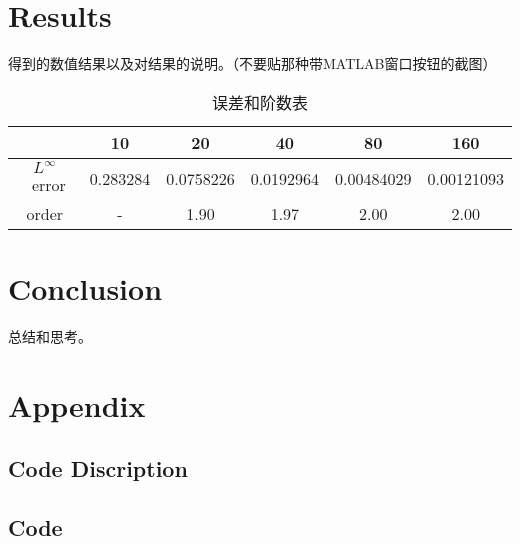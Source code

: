 \documentclass{article}
\begin{document}
\section{Results}

得到的数值结果以及对结果的说明。（不要贴那种带MATLAB窗口按钮的截图）


\begin{table}[ht]
    \centering
    \caption{误差和阶数表}\label{tab:demo0}
    \begin{tabular}{c|ccccc}
        \hline
                           & 10       & 20        & 40        & 80         & 160        \\
        \hline
        $L^{\infty}$~error & 0.283284 & 0.0758226 & 0.0192964 & 0.00484029 & 0.00121093 \\
        order              & -        & 1.90      & 1.97      & 2.00       & 2.00       \\
        \hline
    \end{tabular}
\end{table}



\section{Conclusion}

总结和思考。

\section{Appendix}
\subsection{Code Discription}

\subsection{Code}

\end{document}

